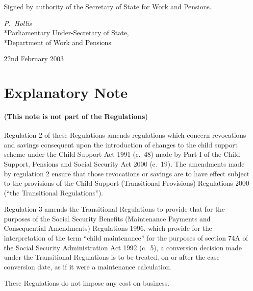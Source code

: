 \documentclass[12pt,a4paper]{article}
\begin{document}
\bigskip

Signed 
by authority of the Secretary of State for Work and Pensions.

{\raggedleft
\emph{P.~Hollis}\\*Parliamentary Under-Secretary of State,\\*Department of Work and Pensions

}


22nd February 2003

\small

\part{Explanatory Note}

\renewcommand\parthead{— Explanatory Note}

\subsection*{(This note is not part of the Regulations)}

Regulation 2 of these Regulations amends regulations which concern revocations and savings consequent upon the introduction of changes to the child support scheme under the Child Support Act 1991 (c.\ 48) made by Part I of the Child Support, Pensions and Social Security Act 2000 (c.\ 19). The amendments made by regulation 2 ensure that those revocations or savings are to have effect subject to the provisions of the Child Support (Transitional Provisions) Regulations 2000 (“the Transitional Regulations”).

Regulation 3 amends the Transitional Regulations to provide that for the purposes of the Social Security Benefits (Maintenance Payments and Consequential Amendments) Regulations 1996, which provide for the interpretation of the term “child maintenance” for the purposes of section 74A of the Social Security Administration Act 1992 (c.\ 5), a conversion decision made under the Transitional Regulations is to be treated, on or after the case conversion date, as if it were a maintenance calculation.

These Regulations do not impose any cost on business. 
\end{document}
